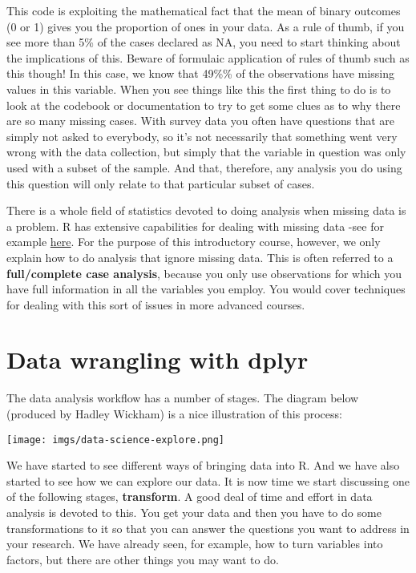 \documentclass[
]{book}
\begin{document}
This code is exploiting the mathematical fact that the mean of binary outcomes (0 or 1) gives you the proportion of ones in your data. As a rule of thumb, if you see more than 5\% of the cases declared as NA, you need to start thinking about the implications of this. Beware of formulaic application of rules of thumb such as this though! In this case, we know that 49\%\% of the observations have missing values in this variable. When you see things like this the first thing to do is to look at the codebook or documentation to try to get some clues as to why there are so many missing cases. With survey data you often have questions that are simply not asked to everybody, so it's not necessarily that something went very wrong with the data collection, but simply that the variable in question was only used with a subset of the sample. And that, therefore, any analysis you do using this question will only relate to that particular subset of cases.

There is a whole field of statistics devoted to doing analysis when missing data is a problem. R has extensive capabilities for dealing with missing data -see for example \href{https://www.routledge.com/Flexible-Imputation-of-Missing-Data-Second-Edition/Buuren/p/book/9781032178639}{here}. For the purpose of this introductory course, however, we only explain how to do analysis that ignore missing data. This is often referred to a \textbf{full/complete case analysis}, because you only use observations for which you have full information in all the variables you employ. You would cover techniques for dealing with this sort of issues in more advanced courses.

\section{Data wrangling with dplyr}\label{data-wrangling-with-dplyr}

The data analysis workflow has a number of stages. The diagram below (produced by Hadley Wickham) is a nice illustration of this process:

\texttt{[image: imgs/data-science-explore.png]}

We have started to see different ways of bringing data into R. And we have also started to see how we can explore our data. It is now time we start discussing one of the following stages, \textbf{transform}. A good deal of time and effort in data analysis is devoted to this. You get your data and then you have to do some transformations to it so that you can answer the questions you want to address in your research. We have already seen, for example, how to turn variables into factors, but there are other things you may want to do.
\end{document}
